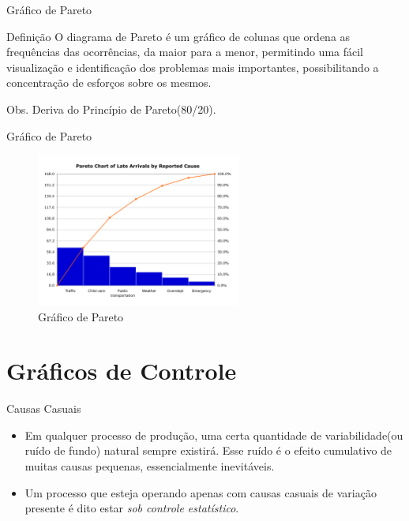 \documentclass[12pt]{beamer}
\begin{document}
  \begin{frame}[t]{Gráfico de Pareto}
    \begin{block}{Definição}
      O diagrama de Pareto é um gráfico de colunas que ordena as frequências das ocorrências, da maior para a menor, permitindo uma fácil visualização e identificação dos problemas mais importantes, possibilitando a concentração de esforços sobre os mesmos.
    \end{block}

    \begin{block}{Obs.}
      Deriva do Princípio de Pareto(80/20).
    \end{block}
  \end{frame}

  \begin{frame}{Gráfico de Pareto}
    \begin{figure}[ht]
      \includegraphics[width=0.6\textwidth]{img/diag-pareto}
      \caption{Gráfico de Pareto}
    \end{figure}
  \end{frame}

%

  \section{Gráficos de Controle}

  \begin{frame}[t]{Causas Casuais}
    \begin{itemize}
      \item Em qualquer processo de produção, uma certa quantidade de variabilidade(ou ruído de fundo) natural sempre existirá. Esse ruído é o efeito cumulativo de muitas causas pequenas, essencialmente inevitáveis.

      \item Um processo que esteja operando apenas com causas casuais de variação presente é dito estar \emph{sob controle estatístico}.
    \end{itemize}
  \end{frame}
\end{document}
